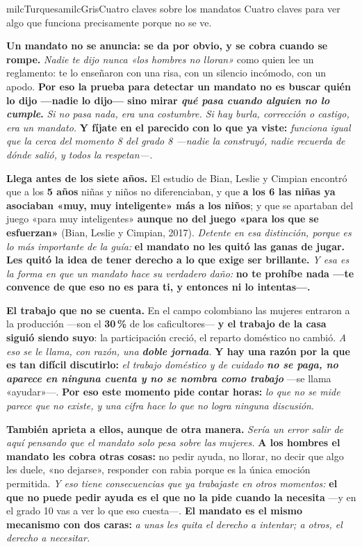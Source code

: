 \documentclass[11pt,letterpaper]{article}
\newcommand{\milcpaso}[3]{%
\Needspace{4\baselineskip}%
\begin{tcolorbox}[enhanced,colback=white,colframe=milcLinea,arc=1.5mm,boxrule=.9pt,
  left=14mm,right=4mm,top=3mm,bottom=3mm,before skip=4pt,after skip=4pt,
  fontupper=\RaggedRight,
  overlay={\node[anchor=north west,circle,fill=#2,text=white,inner sep=0pt,
    minimum size=7.4mm,font=\sffamily\bfseries\small]
    at ([xshift=3.6mm,yshift=-3.2mm]frame.north west) {#1};}]
#3
\end{tcolorbox}}
\begin{document}
\begin{softbox}{milcTurquesa}{milcGris}{Cuatro claves sobre los mandatos}
Cuatro claves para ver algo que funciona precisamente porque no se ve.
\end{softbox}

\milcpaso{1}{milcTurquesa}{\textbf{Un mandato no se anuncia: se da por obvio, y se cobra cuando se rompe.} \emph{Nadie te dijo nunca «los hombres no lloran»} como quien lee un reglamento: te lo enseñaron con una risa, con un silencio incómodo, con un apodo. \textbf{Por eso la prueba para detectar un mandato no es buscar quién lo dijo ---nadie lo dijo--- sino mirar \emph{qué pasa cuando alguien no lo cumple}.} \emph{Si no pasa nada, era una costumbre. Si hay burla, corrección o castigo, era un mandato.} \textbf{Y fíjate en el parecido con lo que ya viste:} \emph{funciona igual que la cerca del momento 8 del grado 8 ---nadie la construyó, nadie recuerda de dónde salió, y todos la respetan---.}}
\milcpaso{2}{milcTurquesa}{\textbf{Llega antes de los siete años.} El estudio de Bian, Leslie y Cimpian encontró que a los \textbf{5 años} niñas y niños no diferenciaban, y que \textbf{a los 6 las niñas ya asociaban «muy, muy inteligente» más a los niños}; y que se apartaban del juego «para muy inteligentes» \textbf{aunque no del juego «para los que se esfuerzan»} (Bian, Leslie y Cimpian, 2017). \emph{Detente en esa distinción, porque es lo más importante de la guía:} \textbf{el mandato no les quitó las ganas de jugar. Les quitó la idea de tener derecho a lo que exige ser brillante.} \emph{Y esa es la forma en que un mandato hace su verdadero daño:} \textbf{no te prohíbe nada ---te convence de que eso no es para ti, y entonces ni lo intentas---.}}
\milcpaso{3}{milcTurquesa}{\textbf{El trabajo que no se cuenta.} En el campo colombiano las mujeres entraron a la producción ---son el \textbf{30\,\%} de los caficultores--- \textbf{y el trabajo de la casa siguió siendo suyo}: la participación creció, el reparto doméstico no cambió. \emph{A eso se le llama, con razón, una \textbf{doble jornada}.} \textbf{Y hay una razón por la que es tan difícil discutirlo:} \emph{el trabajo doméstico y de cuidado \textbf{no se paga, no aparece en ninguna cuenta y no se nombra como trabajo}} ---se llama «ayudar»---. \textbf{Por eso este momento pide contar horas:} \emph{lo que no se mide parece que no existe, y una cifra hace lo que no logra ninguna discusión}.}
\milcpaso{4}{milcTurquesa}{\textbf{También aprieta a ellos, aunque de otra manera.} \emph{Sería un error salir de aquí pensando que el mandato solo pesa sobre las mujeres.} \textbf{A los hombres el mandato les cobra otras cosas:} no pedir ayuda, no llorar, no decir que algo les duele, «no dejarse», responder con rabia porque es la única emoción permitida. \emph{Y eso tiene consecuencias que ya trabajaste en otros momentos:} \textbf{el que no puede pedir ayuda es el que no la pide cuando la necesita} ---y en el grado 10 vas a ver lo que eso cuesta---. \textbf{El mandato es el mismo mecanismo con dos caras:} \emph{a unas les quita el derecho a intentar; a otros, el derecho a necesitar.}}
\end{document}

